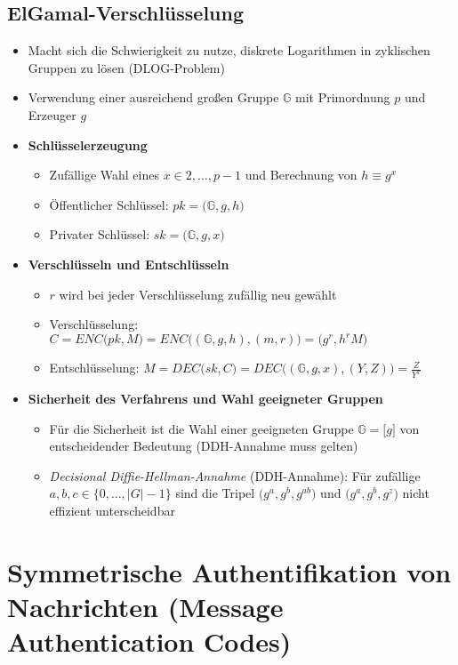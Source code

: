 \subsection{ElGamal-Verschlüsselung}
\begin{itemize}
	\item Macht sich die Schwierigkeit zu nutze, diskrete Logarithmen in zyklischen Gruppen zu lösen (DLOG-Problem)
	\item Verwendung einer ausreichend großen Gruppe \(\mathbb{G}\) mit Primordnung \(p\) und Erzeuger \(g\)
	\item \textbf{Schlüsselerzeugung}
	\begin{itemize}
		\item Zufällige Wahl eines \(x \in 2,\ldots,p-1\) und Berechnung von \(h \equiv g^x\)
		\item Öffentlicher Schlüssel: \(pk = \big(\mathbb{G},g,h\big)\)
		\item Privater Schlüssel: \(sk = \big(\mathbb{G},g,x\big)\)
	\end{itemize}
	\item \textbf{Verschlüsseln und Entschlüsseln}
	\begin{itemize}
		\item \(r\) wird bei jeder Verschlüsselung zufällig neu gewählt
		\item Verschlüsselung: \(C = ENC\big(pk,M\big) = ENC\big((\mathbb{G},g,h),(m,r)\big) = \big(g^r,h^rM\big)\)
		\item Entschlüsselung: \(M = DEC\big(sk,C\big) = DEC\big((\mathbb{G},g,x),(Y,Z)\big) = \frac{Z}{Y^x}\)
	\end{itemize}
	\item \textbf{Sicherheit des Verfahrens und Wahl geeigneter Gruppen}
	\begin{itemize}
		\item Für die Sicherheit ist die Wahl einer geeigneten Gruppe \(\mathbb{G} = \lbrack g \rbrack\) von entscheidender Bedeutung (DDH-Annahme muss gelten)
		\item \textit{Decisional Diffie-Hellman-Annahme} (DDH-Annahme): Für zufällige \(a,b,c \in \big\{0,\ldots,|G|-1\big\}\) sind die Tripel \(\big(g^a,g^b,g^{ab}\big)\) und \(\big(g^a,g^b,g^z\big)\) nicht effizient unterscheidbar
	\end{itemize}
\end{itemize}


\section{Symmetrische Authentifikation von Nachrichten (Message Authentication Codes)}

